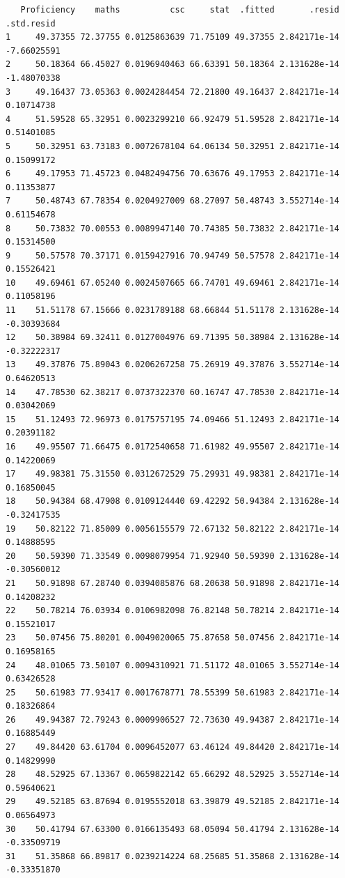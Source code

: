 \documentclass[]{article}
\begin{document}
\begin{verbatim}
   Proficiency    maths          csc     stat  .fitted       .resid  .std.resid
1     49.37355 72.37755 0.0125863639 71.75109 49.37355 2.842171e-14 -7.66025591
2     50.18364 66.45027 0.0196940463 66.63391 50.18364 2.131628e-14 -1.48070338
3     49.16437 73.05363 0.0024284454 72.21800 49.16437 2.842171e-14  0.10714738
4     51.59528 65.32951 0.0023299210 66.92479 51.59528 2.842171e-14  0.51401085
5     50.32951 63.73183 0.0072678104 64.06134 50.32951 2.842171e-14  0.15099172
6     49.17953 71.45723 0.0482494756 70.63676 49.17953 2.842171e-14  0.11353877
7     50.48743 67.78354 0.0204927009 68.27097 50.48743 3.552714e-14  0.61154678
8     50.73832 70.00553 0.0089947140 70.74385 50.73832 2.842171e-14  0.15314500
9     50.57578 70.37171 0.0159427916 70.94749 50.57578 2.842171e-14  0.15526421
10    49.69461 67.05240 0.0024507665 66.74701 49.69461 2.842171e-14  0.11058196
11    51.51178 67.15666 0.0231789188 68.66844 51.51178 2.131628e-14 -0.30393684
12    50.38984 69.32411 0.0127004976 69.71395 50.38984 2.131628e-14 -0.32222317
13    49.37876 75.89043 0.0206267258 75.26919 49.37876 3.552714e-14  0.64620513
14    47.78530 62.38217 0.0737322370 60.16747 47.78530 2.842171e-14  0.03042069
15    51.12493 72.96973 0.0175757195 74.09466 51.12493 2.842171e-14  0.20391182
16    49.95507 71.66475 0.0172540658 71.61982 49.95507 2.842171e-14  0.14220069
17    49.98381 75.31550 0.0312672529 75.29931 49.98381 2.842171e-14  0.16850045
18    50.94384 68.47908 0.0109124440 69.42292 50.94384 2.131628e-14 -0.32417535
19    50.82122 71.85009 0.0056155579 72.67132 50.82122 2.842171e-14  0.14888595
20    50.59390 71.33549 0.0098079954 71.92940 50.59390 2.131628e-14 -0.30560012
21    50.91898 67.28740 0.0394085876 68.20638 50.91898 2.842171e-14  0.14208232
22    50.78214 76.03934 0.0106982098 76.82148 50.78214 2.842171e-14  0.15521017
23    50.07456 75.80201 0.0049020065 75.87658 50.07456 2.842171e-14  0.16958165
24    48.01065 73.50107 0.0094310921 71.51172 48.01065 3.552714e-14  0.63426528
25    50.61983 77.93417 0.0017678771 78.55399 50.61983 2.842171e-14  0.18326864
26    49.94387 72.79243 0.0009906527 72.73630 49.94387 2.842171e-14  0.16885449
27    49.84420 63.61704 0.0096452077 63.46124 49.84420 2.842171e-14  0.14829990
28    48.52925 67.13367 0.0659822142 65.66292 48.52925 3.552714e-14  0.59640621
29    49.52185 63.87694 0.0195552018 63.39879 49.52185 2.842171e-14  0.06564973
30    50.41794 67.63300 0.0166135493 68.05094 50.41794 2.131628e-14 -0.33509719
31    51.35868 66.89817 0.0239214224 68.25685 51.35868 2.131628e-14 -0.33351870

\end{verbatim}
\end{document}
